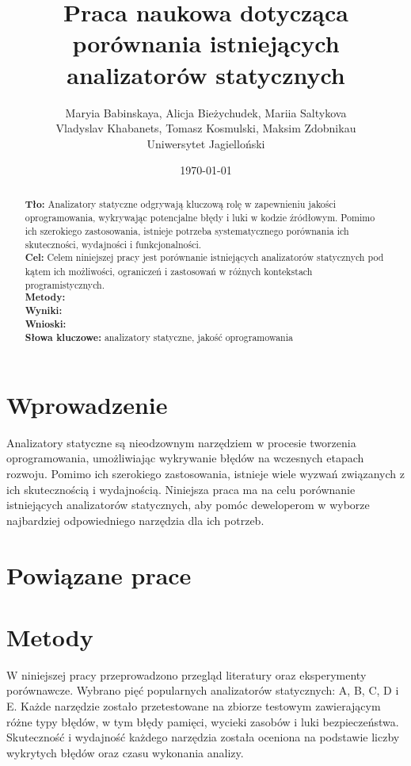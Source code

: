 \documentclass[a4paper,12pt]{article}
\title{Praca naukowa dotycząca porównania istniejących analizatorów statycznych}
\author{Maryia Babinskaya, Alicja Bieżychudek, Mariia Saltykova \\ Vladyslav Khabanets, Tomasz Kosmulski, Maksim Zdobnikau \\ Uniwersytet Jagielloński}
\date{\today}
\begin{document}
\maketitle

\begin{abstract}
\noindent
\textbf{Tło:} Analizatory statyczne odgrywają kluczową rolę w zapewnieniu jakości oprogramowania, wykrywając potencjalne błędy i luki w kodzie źródłowym. Pomimo ich szerokiego zastosowania, istnieje potrzeba systematycznego porównania ich skuteczności, wydajności i funkcjonalności.\\
\textbf{Cel:} Celem niniejszej pracy jest porównanie istniejących analizatorów statycznych pod kątem ich możliwości, ograniczeń i zastosowań w różnych kontekstach programistycznych.\\
\textbf{Metody:} \\
\textbf{Wyniki:} \\
\textbf{Wnioski:} \\
\vspace{0.5cm}
\noindent
\textbf{Słowa kluczowe:} analizatory statyczne, jakość oprogramowania
\end{abstract}

\section{Wprowadzenie}
Analizatory statyczne są nieodzownym narzędziem w procesie tworzenia oprogramowania, umożliwiając wykrywanie błędów na wczesnych etapach rozwoju. Pomimo ich szerokiego zastosowania, istnieje wiele wyzwań związanych z ich skutecznością i wydajnością. Niniejsza praca ma na celu porównanie istniejących analizatorów statycznych, aby pomóc deweloperom w wyborze najbardziej odpowiedniego narzędzia dla ich potrzeb.

\section{Powiązane prace}

\section{Metody}
W niniejszej pracy przeprowadzono przegląd literatury oraz eksperymenty porównawcze. Wybrano pięć popularnych analizatorów statycznych: A, B, C, D i E. Każde narzędzie zostało przetestowane na zbiorze testowym zawierającym różne typy błędów, w tym błędy pamięci, wycieki zasobów i luki bezpieczeństwa. Skuteczność i wydajność każdego narzędzia została oceniona na podstawie liczby wykrytych błędów oraz czasu wykonania analizy.
\end{document}
